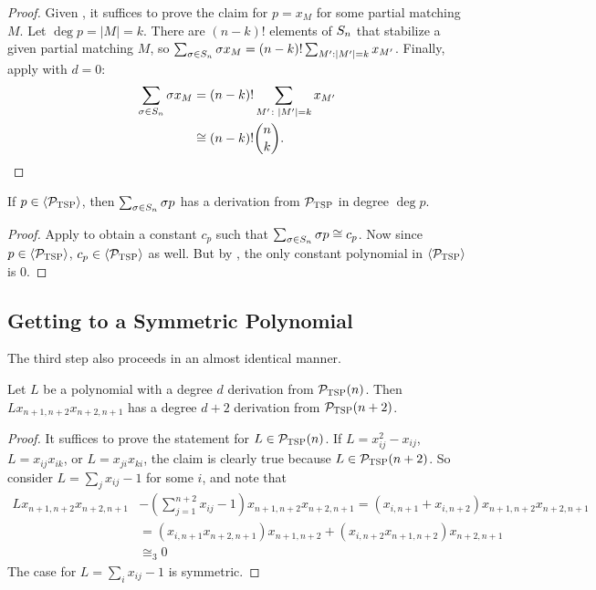 \begin{proof}
Given ,
it suffices to prove the claim for
\(p = x_{M}\) for some partial matching \(M\).
Let $\deg p = |M| = k$.
There are $(n-k)!$ elements of $S_{n}$ that stabilize a given partial matching $M$, so
$\sum_{\sigma \in S_{n}} \sigma x_M = (n-k)!\sum_{M': |M'| = k} x_{M'}$.
Finally, apply  with $d = 0$:
\begin{equation*}
  \begin{split}
  \sum_{\sigma \in S_{n}} \sigma x_{M}
  &= (n-k)! \sum_{M' \colon \left|M'\right| = k} x_{M'} \\
  &\cong
  (n-k)!\binom{n}{k}.
  \end{split}
\end{equation*}
\end{proof}
\begin{corollary}\label{cor:tsp-constantiszero}
If $p \in \langle \mathcal P_{\textsc{TSP}} \rangle$, then $\sum_{\sigma \in S_{n}} \sigma p$ has a derivation from $\mathcal P_{\textsc{TSP}}$ in degree $\deg p$.
\end{corollary}
\begin{proof}
Apply  to obtain a constant $c_p$ such that $\sum_{\sigma \in S_{n}} \sigma p \cong c_p$. 
Now since $p \in \langle \mathcal P_{\textsc{TSP}} \rangle$, $c_p \in \langle \mathcal P_{\textsc{TSP}} \rangle$ as well. But by , the only constant polynomial in $\langle \mathcal P_{\textsc{TSP}} \rangle$ is $0$.
\end{proof}

\subsection{Getting to a Symmetric Polynomial}
The third step also proceeds in an almost identical manner.
\begin{lemma}
  \label{lem:tsp-degree-increase}
  Let \(L\) be a polynomial with a degree $d$ derivation from $\mathcal P_{\textsc{TSP}}(n)$.
	Then $Lx_{n+1,n+2}x_{n+2,n+1}$ has a degree $d+2$ derivation from $\mathcal P_{\textsc{TSP}}(n+2)$.
\end{lemma}
\begin{proof}
It suffices to prove the statement for $L \in \mathcal P_{\textsc{TSP}}(n)$. 
If $L = x_{ij}^2 - x_{ij}$, $L = x_{ij}x_{ik}$, or $L = x_{ji}x_{ki}$, the claim is clearly true because $L \in \mathcal P_{\textsc{TSP}}(n+2)$.
So consider $L = \sum_j x_{ij} - 1$ for some $i$, and note that 
\begin{align*}
Lx_{n+1,n+2}x_{n+2,n+1} &- \left(\sum_{j=1}^{n+2} x_{ij} - 1\right)x_{n+1,n+2}x_{n+2,n+1} = \left(x_{i,n+1} + x_{i,n+2}\right)x_{n+1,n+2}x_{n+2,n+1} \\
&= \left(x_{i,n+1}x_{n+2,n+1}\right)x_{n+1,n+2} + \left(x_{i,n+2}x_{n+1,n+2}\right)x_{n+2,n+1} \\
&\cong_3 0
\end{align*}
The case for $L = \sum_i x_{ij} - 1$ is symmetric.
\end{proof}

